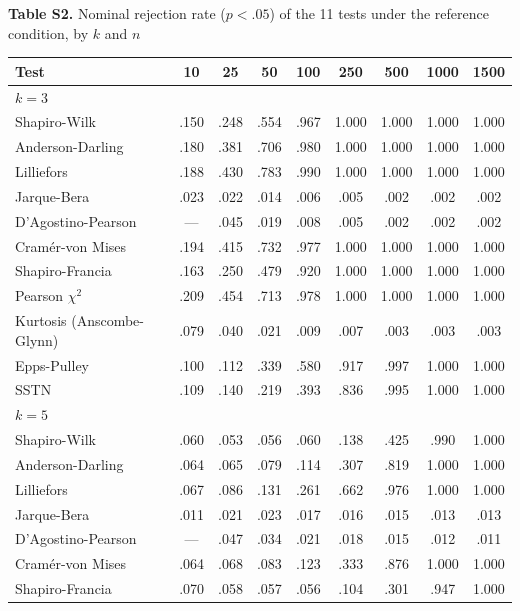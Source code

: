 \documentclass[11pt]{article}
\begin{document}
\clearpage
\begin{table}[h]
\centering
\textbf{Table S2.} Nominal rejection rate ($p<.05$) of the 11 tests under the reference condition, by $k$ and $n$\par\medskip
\small
\begin{tabular}{lcccccccc}
\toprule
Test & 10 & 25 & 50 & 100 & 250 & 500 & 1000 & 1500 \\
\midrule
\multicolumn{9}{l}{\textit{$k=3$}} \\
Shapiro-Wilk & .150 & .248 & .554 & .967 & 1.000 & 1.000 & 1.000 & 1.000 \\
Anderson-Darling & .180 & .381 & .706 & .980 & 1.000 & 1.000 & 1.000 & 1.000 \\
Lilliefors & .188 & .430 & .783 & .990 & 1.000 & 1.000 & 1.000 & 1.000 \\
Jarque-Bera & .023 & .022 & .014 & .006 & .005 & .002 & .002 & .002 \\
D'Agostino-Pearson & --- & .045 & .019 & .008 & .005 & .002 & .002 & .002 \\
Cram\'er-von Mises & .194 & .415 & .732 & .977 & 1.000 & 1.000 & 1.000 & 1.000 \\
Shapiro-Francia & .163 & .250 & .479 & .920 & 1.000 & 1.000 & 1.000 & 1.000 \\
Pearson $\chi^2$ & .209 & .454 & .713 & .978 & 1.000 & 1.000 & 1.000 & 1.000 \\
Kurtosis (Anscombe-Glynn) & .079 & .040 & .021 & .009 & .007 & .003 & .003 & .003 \\
Epps-Pulley & .100 & .112 & .339 & .580 & .917 & .997 & 1.000 & 1.000 \\
SSTN & .109 & .140 & .219 & .393 & .836 & .995 & 1.000 & 1.000 \\
\midrule
\multicolumn{9}{l}{\textit{$k=5$}} \\
Shapiro-Wilk & .060 & .053 & .056 & .060 & .138 & .425 & .990 & 1.000 \\
Anderson-Darling & .064 & .065 & .079 & .114 & .307 & .819 & 1.000 & 1.000 \\
Lilliefors & .067 & .086 & .131 & .261 & .662 & .976 & 1.000 & 1.000 \\
Jarque-Bera & .011 & .021 & .023 & .017 & .016 & .015 & .013 & .013 \\
D'Agostino-Pearson & --- & .047 & .034 & .021 & .018 & .015 & .012 & .011 \\
Cram\'er-von Mises & .064 & .068 & .083 & .123 & .333 & .876 & 1.000 & 1.000 \\
Shapiro-Francia & .070 & .058 & .057 & .056 & .104 & .301 & .947 & 1.000 \\

\end{tabular}
\end{table}
\end{document}
